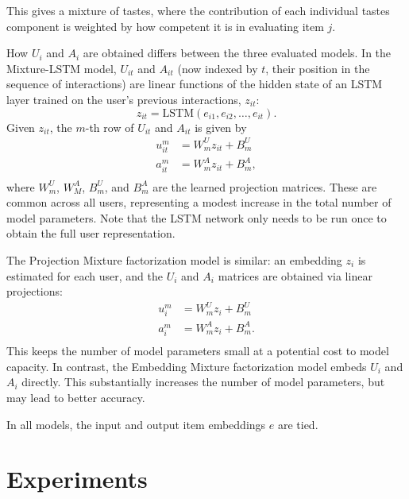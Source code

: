 \documentclass[sigconf]{acmart}
\begin{document}
This gives a mixture of tastes, where the contribution of each individual tastes component is weighted by how competent it is in evaluating item $j$.

How $U_i$ and $A_i$ are obtained differs between the three evaluated models. In the Mixture-LSTM model, $U_{it}$ and $A_{it}$ (now indexed by $t$, their position in the sequence of interactions) are linear functions of the hidden state of an LSTM layer trained on the user's previous interactions, $z_{it}$:
\begin{equation}
  \label{eq:lstm}
  z_{it} = \mathrm{LSTM}\left(e_{i1}, e_{i2}, \ldots, e_{it}\right).
\end{equation}
Given $z_{it}$, the $m$-th row of $U_{it}$ and $A_{it}$ is given by
\begin{equation}
\begin{aligned}
  u^m_{it} &= W^U_mz_{it} + B^U_m\\
  a^m_{it} &= W^A_mz_{it} + B^A_m,\\
\end{aligned}
\end{equation}
where $W^U_m$, $W^A_M$, $B^U_m$, and $B^A_m$ are the learned projection matrices. These are common across all users, representing a modest increase in the total number of model parameters. Note that the LSTM network only needs to be run once to obtain the full user representation.

The Projection Mixture factorization model is similar: an embedding $z_i$ is estimated for each user, and the $U_i$ and $A_i$ matrices are obtained via linear projections:
\begin{equation}
\begin{aligned}
  u^m_{i} &= W^U_mz_{i} + B^U_m\\
  a^m_{i} &= W^A_mz_{i} + B^A_m.\\
\end{aligned}
\end{equation}
This keeps the number of model parameters small at a potential cost to model capacity. In contrast, the Embedding Mixture factorization model embeds $U_i$ and $A_i$ directly. This substantially increases the number of model parameters, but may lead to better accuracy.

In all models, the input and output item embeddings $e$ are tied.

\section{Experiments}
\end{document}
